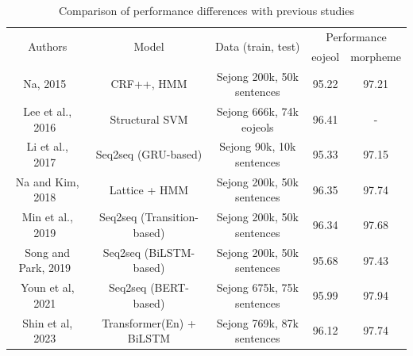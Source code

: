 \documentclass[AMS,STIX2COL]{WileyNJD-v2}
\begin{document}
    \begin{table}[]
        \caption{Comparison of performance differences with previous studies}\label{tab:differences-with-previous-studies}
        \begin{tabular*}{500pt}{@{\extracolsep\fill}ccc|cc@{\extracolsep\fill}}
            \toprule
            \multirow{2}{*}{Authors}              & \multirow{2}{*}{Model}                     & \multirow{2}{*}{Data (train, test)}         & \multicolumn{2}{c}{Performance}                           \\
            \cmidrule{4-5}
            ~                                     & ~                                          & ~                                           & \multicolumn{1}{c}{eojeol} & \multicolumn{1}{c}{morpheme} \\
            \midrule
            Na, 2015~\cite{NaSH2015}              & CRF++, HMM                                 & Sejong 200k, 50k sentences                  & 95.22                      & 97.21                        \\
            Lee et al., 2016~\cite{LeeCH2016}     & Structural SVM                             & Sejong 666k, 74k eojeols                    & 96.41                      & -                            \\
            Li et al., 2017~\cite{Li2017}         & Seq2seq (GRU-based)                        & Sejong 90k, 10k sentences                   & 95.33                      & 97.15                        \\
            Na and Kim, 2018~\cite{NaSH2018}      & Lattice + HMM                              & Sejong 200k, 50k sentences                  & 96.35                      & 97.74                        \\
            Min et al., 2019~\cite{MinJW2019}     & Seq2seq (Transition-based)                 & Sejong 200k, 50k sentences                  & 96.34                      & 97.68                        \\
            Song and Park, 2019~\cite{SongHJ2019} & Seq2seq (BiLSTM-based)                     & Sejong 200k, 50k sentences                  & 95.68                      & 97.43                        \\
            Youn et al, 2021~\cite{YounJY2021}    & Seq2seq (BERT-based)                       & Sejong 675k, 75k sentences                  & 95.99                      & 97.94                        \\
            Shin et al, 2023~\cite{ShinHJ2023}    & Transformer(En) + BiLSTM                   & Sejong 769k, 87k sentences                  & 96.12                      & 97.74                        \\

\end{tabular*}
\end{table}
\end{document}
